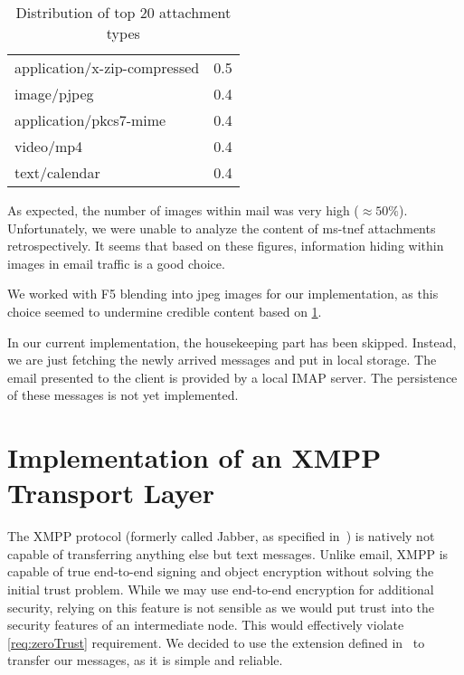 \begin{table}[ht]
\begin{tabular}{l|r}
		application/x-zip-compressed                                                &    0.5\\
		image/pjpeg                                                                 &    0.4\\
		application/pkcs7-mime                                                      &    0.4\\
		video/mp4                                                                   &    0.4\\
		text/calendar                                                               &    0.4\\\hline
	\end{tabular}
	\caption{Distribution of top 20 attachment types}
	\label{tab:emailAttachments}
\end{table}

As expected, the number of images within mail was very high ($\approx 50\%$). Unfortunately, we were unable to analyze the content of ms-tnef attachments retrospectively. It seems that based on these figures, information hiding within images in email traffic is a good choice.

We worked with F5 blending into jpeg images for our implementation, as this choice seemed to undermine credible content based on \cref{tab:emailAttachments}.

In our current implementation, the housekeeping part has been skipped. Instead, we are just fetching the newly arrived messages and put in local storage. The email presented to the client is provided by a local IMAP server. The persistence of these messages is not yet implemented. 

\section{Implementation of an XMPP Transport Layer}
The XMPP protocol (formerly called  Jabber, as specified in~\cite{rfc6120}) is natively not capable of transferring anything else but text messages. Unlike email, XMPP is capable of true end-to-end signing and object encryption without solving the initial trust problem. While we may use end-to-end encryption for additional security, relying on this feature is not sensible as we would put trust into the security features of an intermediate node. This would effectively violate \ref{req:zeroTrust} requirement. We decided to use the extension defined in~\cite{xep0231} to transfer our messages, as it is simple and reliable.

